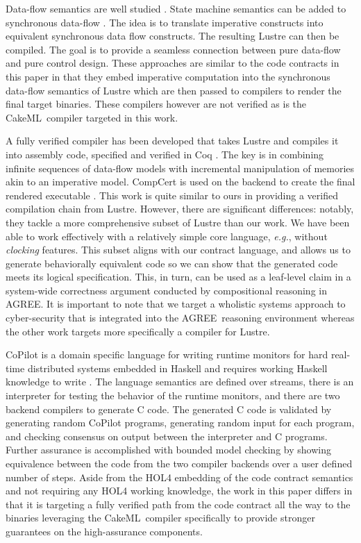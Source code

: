\documentclass[global,twocolumn]{svjour}
\newcommand{\agr}{AGREE}
\newcommand{\ckml}{CakeML}
\newcommand{\eg}{\textit{e.g.}}
\begin{document}
Data-flow semantics are well studied \cite{10.1145/41625.41641,97300, 10.1145/1379023.1375674,10.1145/2345141.2248426,10.1007/978-3-540-45212-6_10}.
%
State machine semantics can be added to synchronous data-flow \cite{10.1145/1086228.1086261}.
%
The idea is to translate imperative constructs into equivalent synchronous data flow constructs.
%
The resulting Lustre can then be compiled. The goal is to provide a seamless connection between pure data-flow and pure control design.
%
These approaches are similar to the code contracts in this paper in that they embed imperative computation into the synchronous data-flow semantics of Lustre which are then passed to compilers to render the final target binaries.
%
These compilers however are not verified as is the \ckml\ compiler targeted in this work.

A fully verified compiler has been developed that takes Lustre and compiles it into assembly code, specified and verified in Coq \cite{10.1145/3140587.3062358}.
%
The key is in combining infinite sequences of data-flow models with incremental manipulation of memories akin to an imperative model.
%
CompCert is used on the backend to create the final rendered executable \cite{compcert}.
%
This work is quite similar to ours in providing a verified compilation chain from Lustre.
%
However, there are significant differences: notably, they tackle a more comprehensive subset of Lustre than our work.
%
We have been able to work effectively with a relatively simple core language, \eg, without \emph{clocking} features.
%
This subset aligns with our contract language, and allows us to generate behaviorally equivalent code so we can show that the generated code meets its logical specification.
%
This, in turn, can be used as a leaf-level claim in a system-wide correctness argument conducted by compositional reasoning in \agr.
%
It is important to note that we target a wholistic systems approach to cyber-security that is integrated into the \agr\ reasoning environment whereas the other work targets more specifically a compiler for Lustre.

CoPilot is a domain specific language for writing runtime monitors for hard real-time distributed systems embedded in Haskell and requires working Haskell knowledge to write \cite{10.1007/s11334-013-0223-x}.
%
The language semantics are defined over streams, there is an interpreter for testing the behavior of the runtime monitors, and there are two backend compilers to generate C code.
%
The generated C code is validated by generating random CoPilot programs, generating random input for each program, and checking consensus on output between the interpreter and C programs.
%
Further assurance is accomplished with bounded model checking by showing equivalence between the code from the two compiler backends over a user defined number of steps.
%
Aside from the HOL4 embedding of the code contract semantics and not requiring any HOL4 working knowledge, the work in this paper differs in that it is targeting a fully verified path from the code contract all the way to the binaries leveraging the \ckml\ compiler specifically to provide stronger guarantees on the high-assurance components.
\end{document}
